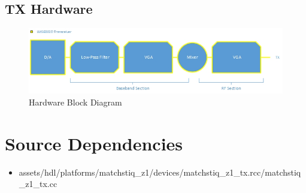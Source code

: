 \documentclass{article}
\begin{document}
\subsection*{TX Hardware}
\begin{figure}[ht]
	\centerline{\includegraphics[scale=0.7]{matchstiq_FE_TX_HW}}
	\caption{Hardware Block Diagram}
	\label{fig:hw}
\end{figure}
\vspace{25 mm}
\newpage

\section*{Source Dependencies}
\begin{itemize}
	\item assets/hdl/platforms/matchstiq\_z1/devices/matchstiq\_z1\_tx.rcc/matchstiq\_z1\_tx.cc
\end{itemize}
\end{document}
